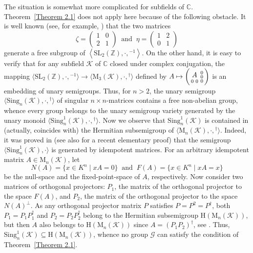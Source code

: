 \documentclass[11pt,reqno]{amsart}
\numberwithin{equation}{section}
\def\bb{\mathbb}
\theoremstyle{remark}
\def\H{\mathrm H}
\begin{document}
The situation is somewhat more complicated for subfields of $\bb
C$. Theorem~\ref{Theorem 2.1} does not apply here because of the
following obstacle. It is well known (see, for example,
\cite[p.\,101]{mks}) that the two matrices
\begin{equation}
\label{free subgroup} \zeta=\begin{pmatrix} 1 & 0\\ 2 &
1\end{pmatrix} \ \text{ and } \ \eta=\begin{pmatrix} 1 & 2\\ 0 &
1\end{pmatrix}
\end{equation}
generate a free subgroup of $\left<\mathrm{SL}_2(\bb
Z),\cdot,{}^{-1}\right>$. On the other hand, it is easy to verify
that for any subfield $\mathcal{K}$ of $\bb C$ closed under
complex conjugation, the mapping $\langle\mathrm{SL}_2(\bb
Z),\cdot,{}^{-1}\rangle\to\langle\mathrm{M}_3(\mathcal{K}),\cdot,{}^\dag\rangle$
defined by $A\mapsto\left(\begin{matrix} \raisebox{-4.5pt}{$A$}\\
\begin{smallmatrix} 0 & 0 \end{smallmatrix}\end{matrix}
\begin{smallmatrix} 0 \\ 0\\ 0\end{smallmatrix}\right)$
is an embedding of unary semigroups. Thus, for $n>2$, the unary
semigroup
$\langle\mathrm{Sing}_n(\mathcal{K}),\cdot,{}^\dag\rangle$ of
singular $n\times n$-matrices contains a free non-abelian group,
whence every group belongs to the unary semigroup variety
generated by the unary monoid
$\langle\mathrm{Sing}^1_n(\mathcal{K}),\cdot,{}^\dag\rangle$. Now
we observe that $\mathrm{Sing}^1_n(\mathcal{K})$ is contained in
(actually, coincides with) the Hermitian subsemigroup of
$\langle\mathrm{M}_n(\mathcal{K}),\cdot,{}^\dag\rangle$. Indeed,
it was proved in \cite{Erdos} (see also \cite{AM} for a recent
elementary proof) that the semigroup
$\langle\mathrm{Sing}^1_n(\mathcal{K}),\cdot\rangle$ is generated
by idempotent matrices. For an arbitrary idempotent matrix
$A\in\mathrm{M}_n(\mathcal{K})$, let $$N(A)=\{x\in K^n\mid xA=0\}\
\text{ and } \  F(A)=\{x\in K^n\mid xA=x\}$$ be the null-space and
the fixed-point-space of $A$, respectively. Now consider two
matrices of orthogonal projectors: $P_1$, the matrix of the
orthogonal projector to the space $F(A)$, and $P_2$, the matrix of
the orthogonal projector to the space $N(A)^\perp$. As any
orthogonal projector matrix $P$ satisfies $P=P^2=P^\dag$, both
$P_1=P_1P_1^\dag$ and $P_2=P_2P_2^\dag$ belong to the Hermitian
subsemigroup $\H(\mathrm{M}_n(\mathcal{K}))$, but then $A$ also
belongs to $\H(\mathrm{M}_n(\mathcal{K}))$ since
$A=(P_1P_2)^\dag$, see \cite[Exercise~5.15.9a]{Meyer}. Thus,
$\mathrm{Sing}^1_n(\mathcal{K})\subseteq
\H(\mathrm{M}_n(\mathcal{K}))$, whence no group $\mathcal{G}$ can
satisfy the condition of Theorem~\ref{Theorem 2.1}.
\end{document}
